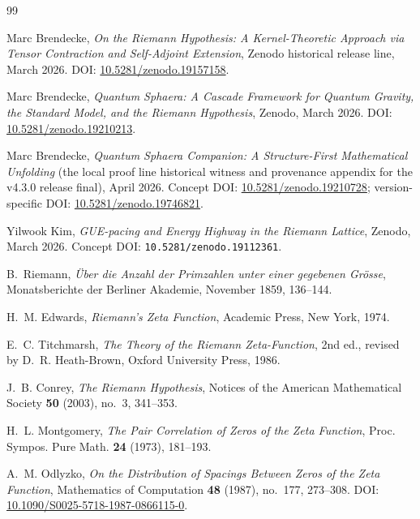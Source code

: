 \documentclass[12pt,a4paper]{article}
\begin{document}
\begin{thebibliography}{99}

Marc Brendecke,
\emph{On the Riemann Hypothesis: A Kernel-Theoretic Approach via Tensor Contraction and Self-Adjoint Extension},
Zenodo historical release line, March 2026.
\newblock DOI: \href{https://doi.org/10.5281/zenodo.19157158}{10.5281/zenodo.19157158}.

Marc Brendecke,
\emph{Quantum Sphaera: A Cascade Framework for Quantum Gravity, the Standard Model, and the Riemann Hypothesis},
Zenodo, March 2026.
\newblock DOI: \href{https://doi.org/10.5281/zenodo.19210213}{10.5281/zenodo.19210213}.

Marc Brendecke,
\emph{Quantum Sphaera Companion: A Structure-First Mathematical Unfolding} (the local proof line historical witness and provenance appendix for the v4.3.0 release final),
April 2026.
\newblock Concept DOI: \href{https://doi.org/10.5281/zenodo.19210728}{10.5281/zenodo.19210728}; version-specific DOI: \href{https://doi.org/10.5281/zenodo.19746821}{10.5281/zenodo.19746821}.

Yilwook Kim,
\emph{GUE-pacing and Energy Highway in the Riemann Lattice},
Zenodo, March 2026.
\newblock Concept DOI: \texttt{10.5281/zenodo.19112361}.

B.~Riemann,
\emph{\"Uber die Anzahl der Primzahlen unter einer gegebenen Gr\"osse},
Monatsberichte der Berliner Akademie, November 1859, 136--144.

H.~M. Edwards,
\emph{Riemann's Zeta Function},
Academic Press, New York, 1974.

E.~C. Titchmarsh,
\emph{The Theory of the Riemann Zeta-Function},
2nd ed., revised by D.~R. Heath-Brown,
Oxford University Press, 1986.

J.~B. Conrey,
\emph{The Riemann Hypothesis},
Notices of the American Mathematical Society \textbf{50} (2003), no.~3, 341--353.

H.~L. Montgomery,
\emph{The Pair Correlation of Zeros of the Zeta Function},
Proc. Sympos. Pure Math. \textbf{24} (1973), 181--193.

A.~M. Odlyzko,
\emph{On the Distribution of Spacings Between Zeros of the Zeta Function},
Mathematics of Computation \textbf{48} (1987), no.~177, 273--308.
\newblock DOI: \href{https://doi.org/10.1090/S0025-5718-1987-0866115-0}{10.1090/S0025-5718-1987-0866115-0}.


\end{thebibliography}
\end{document}
